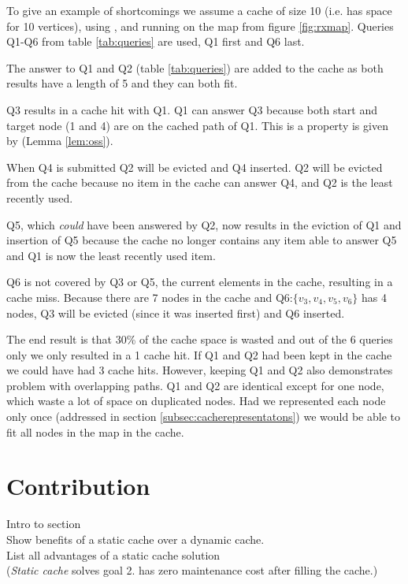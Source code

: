 To give an example of \lrus shortcomings we assume a cache of size 10 (i.e. has space for 10 vertices), using \lruns, and running on the map from figure \ref{fig:rxmap}. Queries Q1-Q6 from table \ref{tab:queries} are used, Q1 first and Q6 last.

The answer to Q1 and Q2 (table \ref{tab:queries}) are added to the cache as both results have a length of 5 and they can both fit. 

Q3 results in a cache hit with Q1. Q1 can answer Q3 because both start and target node (1 and 4) are on the cached path of Q1. This is a property is given by \oss (Lemma \ref{lem:oss}).

When Q4 is submitted Q2 will be evicted and Q4 inserted. Q2 will be evicted from the cache because no item in the cache can answer Q4, and Q2 is the least recently used.

Q5, which \textit{could} have been answered by Q2, now results in the eviction of Q1 and insertion of Q5 because the cache no longer contains any item able to answer Q5 and Q1 is now the least recently used item.

Q6 is not covered by Q3 or Q5, the current elements in the cache, resulting in a cache miss. Because there are 7 nodes in the cache and Q6:$\{v_3,v_4,v_5,v_6\}$ has 4 nodes, Q3 will be evicted (since it was inserted first) and Q6 inserted. 

The end result is that 30\% of the cache space is wasted and out of the 6 queries only we only resulted in a 1 cache hit. If Q1 and Q2 had been kept in the cache we could have had 3 cache hits. However, keeping Q1 and Q2 also  demonstrates \lrus problem with overlapping paths. Q1 and Q2 are identical except for one node, which waste a lot of space on duplicated nodes. Had we represented each node only once (addressed in section \ref{subsec:cacherepresentatons}) we would be able to fit all nodes in the map in the cache.




\section{Contribution} \label{sec:contribution}

Intro to section \\
Show benefits of a static cache over a dynamic cache.\\
List all advantages of a static cache solution \\
(\textit{Static cache} solves goal 2. has zero maintenance cost after filling the cache.)

